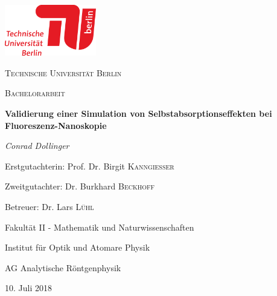 \documentclass[12pt,a4paper,ngerman,twoside]{scrbook}
\begin{document}
\begin{titlepage}
	\centering
	\includegraphics[width=0.3\textwidth]{illustrations/tu_logo.png}\par\vspace{1cm}
	{\scshape\LARGE Technische Universit\"at Berlin \par}
	\vspace{1cm}
	{\scshape\Large Bachelorarbeit\par}
	\vspace{1.5cm}
	{\Large\bfseries Validierung einer Simulation von Selbstabsorptionseffekten bei Fluoreszenz-Nanoskopie\par}
	\vspace{2cm}
	{\Large\itshape Conrad Dollinger\par}
	\vfill
	
	Erstgutachterin: Prof. Dr. Birgit  \textsc{Kanngie\ss er}\par
	Zweitgutachter: Dr. Burkhard \textsc{Beckhoff}\par
	\vspace{0.5cm}
	Betreuer: Dr. Lars \textsc{Lühl}\par
	\vfill
	Fakultät II - Mathematik und Naturwissenschaften\par
	Institut für Optik und Atomare Physik\par 
	AG Analytische Röntgenphysik \par
\vspace{0.5cm}
	{\large 10. Juli 2018\par}
\end{titlepage}
\newpage 
\thispagestyle{empty} %
\addtocounter{page}{-1}
\quad

\newpage
\thispagestyle{empty} %

\addtocounter{page}{-1}

\newpage 
\thispagestyle{empty} %
\addtocounter{page}{-1}
\quad


\newpage
{} %
\tableofcontents
\end{document}
